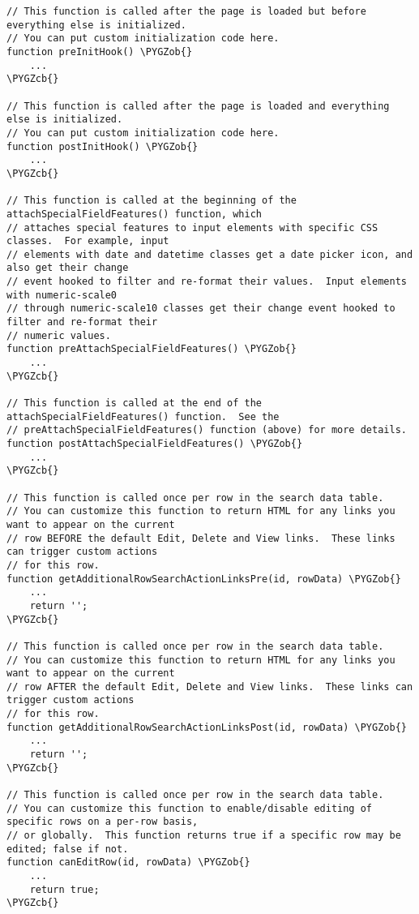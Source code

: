 \documentclass[letterpaper,10pt,english]{sphinxmanual}
\def\PYGZob{\char`\{}
\def\PYGZcb{\char`\}}
\begin{document}
\begin{Verbatim}[commandchars=\\\{\}]
// This function is called after the page is loaded but before everything else is initialized.
// You can put custom initialization code here.
function preInitHook() \PYGZob{}
    ...
\PYGZcb{}

// This function is called after the page is loaded and everything else is initialized.
// You can put custom initialization code here.
function postInitHook() \PYGZob{}
    ...
\PYGZcb{}

// This function is called at the beginning of the attachSpecialFieldFeatures() function, which
// attaches special features to input elements with specific CSS classes.  For example, input
// elements with date and datetime classes get a date picker icon, and also get their change
// event hooked to filter and re-format their values.  Input elements with numeric-scale0
// through numeric-scale10 classes get their change event hooked to filter and re-format their
// numeric values.
function preAttachSpecialFieldFeatures() \PYGZob{}
    ...
\PYGZcb{}

// This function is called at the end of the attachSpecialFieldFeatures() function.  See the
// preAttachSpecialFieldFeatures() function (above) for more details.
function postAttachSpecialFieldFeatures() \PYGZob{}
    ...
\PYGZcb{}

// This function is called once per row in the search data table.
// You can customize this function to return HTML for any links you want to appear on the current
// row BEFORE the default Edit, Delete and View links.  These links can trigger custom actions
// for this row.
function getAdditionalRowSearchActionLinksPre(id, rowData) \PYGZob{}
    ...
    return '';
\PYGZcb{}

// This function is called once per row in the search data table.
// You can customize this function to return HTML for any links you want to appear on the current
// row AFTER the default Edit, Delete and View links.  These links can trigger custom actions
// for this row.
function getAdditionalRowSearchActionLinksPost(id, rowData) \PYGZob{}
    ...
    return '';
\PYGZcb{}

// This function is called once per row in the search data table.
// You can customize this function to enable/disable editing of specific rows on a per-row basis,
// or globally.  This function returns true if a specific row may be edited; false if not.
function canEditRow(id, rowData) \PYGZob{}
    ...
    return true;
\PYGZcb{}


\end{Verbatim}
\end{document}
